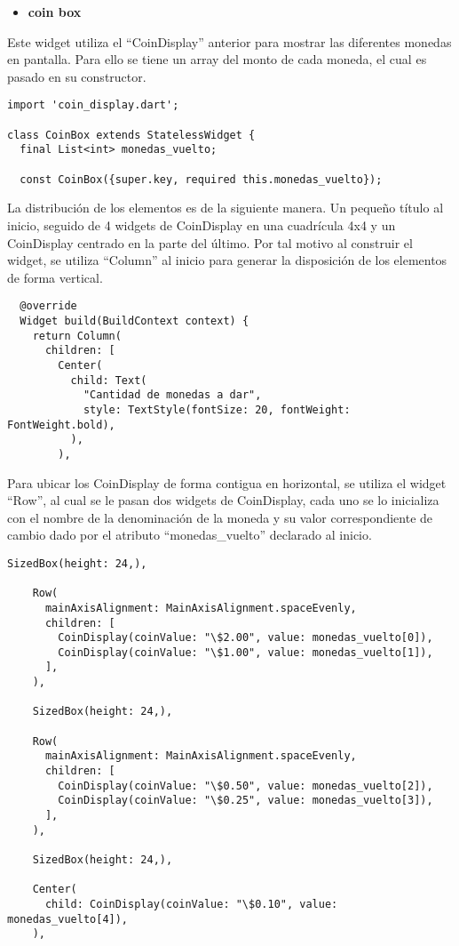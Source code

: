 \begin{itemize}
    \item \textbf{coin box}
\end{itemize}

Este widget utiliza el “CoinDisplay” anterior para mostrar las diferentes monedas en pantalla. Para ello se tiene un array del monto de cada moneda, el cual es pasado en su constructor.

\begin{center}
\begin{lstlisting}
import 'coin_display.dart';

class CoinBox extends StatelessWidget {
  final List<int> monedas_vuelto;

  const CoinBox({super.key, required this.monedas_vuelto});
\end{lstlisting}
\end{center}

La distribución de los elementos es de la siguiente manera. Un pequeño título al inicio, seguido de 4 widgets de CoinDisplay en una cuadrícula 4x4 y un CoinDisplay centrado en la parte del último. Por tal motivo al construir el widget, se utiliza “Column” al inicio para generar la disposición de los elementos de forma vertical.

\begin{center}
\begin{lstlisting}
  @override
  Widget build(BuildContext context) {
    return Column(
      children: [
        Center(
          child: Text(
            "Cantidad de monedas a dar",
            style: TextStyle(fontSize: 20, fontWeight: FontWeight.bold),
          ),
        ),
\end{lstlisting}
\end{center}

Para ubicar los CoinDisplay de forma contigua en horizontal, se utiliza el widget “Row”, al cual se le pasan dos widgets de CoinDisplay, cada uno se lo inicializa con el nombre de la denominación de la moneda y su valor correspondiente de cambio dado por el atributo “monedas\_vuelto” declarado al inicio.

\begin{center}
\begin{lstlisting}
SizedBox(height: 24,),

    Row(
      mainAxisAlignment: MainAxisAlignment.spaceEvenly,
      children: [
        CoinDisplay(coinValue: "\$2.00", value: monedas_vuelto[0]),
        CoinDisplay(coinValue: "\$1.00", value: monedas_vuelto[1]),
      ],
    ),

    SizedBox(height: 24,),

    Row(
      mainAxisAlignment: MainAxisAlignment.spaceEvenly,
      children: [
        CoinDisplay(coinValue: "\$0.50", value: monedas_vuelto[2]),
        CoinDisplay(coinValue: "\$0.25", value: monedas_vuelto[3]),
      ],
    ),

    SizedBox(height: 24,),

    Center(
      child: CoinDisplay(coinValue: "\$0.10", value: monedas_vuelto[4]),
    ),
\end{lstlisting}
\end{center}


